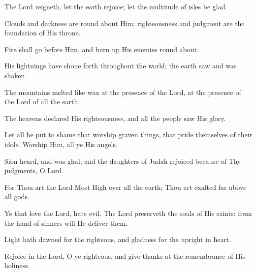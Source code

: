 The Lord reigneth, let the earth rejoice; let the multitude of isles be glad.

Clouds and darkness are round about Him; righteousness and judgment are the foundation of His throne.

Fire shall go before Him, and burn up His enemies round about.

His lightnings have shone forth throughout the world; the earth saw and was shaken.

The mountains melted like wax at the presence of the Lord, at the presence of the Lord of all the earth.

The heavens declared His righteousness, and all the people saw His glory.

Let all be put to shame that worship graven things, that pride themselves of their idols. Worship Him, all ye His angels.

Sion heard, and was glad, and the daughters of Judah rejoiced because of Thy judgments, O Lord.

For Thou art the Lord Most High over all the earth; Thou art exalted far above all gods.

Ye that love the Lord, hate evil. The Lord preserveth the souls of His saints; from the hand of sinners will He deliver them.

Light hath dawned for the righteous, and gladness for the upright in heart.

Rejoice in the Lord, O ye righteous, and give thanks at the remembrance of His holiness.

